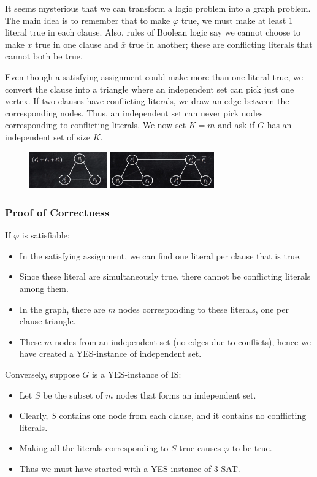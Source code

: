 It seems mysterious that we can transform a logic problem into a graph problem. The main idea is to remember that to make $\varphi$ true, we must make at least 1 literal true in each clause. Also, rules of Boolean logic say we cannot choose to make $x$ true in one clause and $\bar{x}$ true in another; these are conflicting literals that cannot both be true.

Even though a satisfying assignment could make more than one literal true, we convert the clause into a triangle where an independent set can pick just one vertex. If two clauses have conflicting literals, we draw an edge between the corresponding nodes. Thus, an independent set can never pick nodes corresponding to conflicting literals. We now set $K = m$ and ask if $G$ has an independent set of size $K$.

\begin{figure}[H]
	\centering
	\includegraphics[width=0.3\textwidth]{fig/3-literal.png}	\includegraphics[width=0.4\textwidth]{fig/converse-literal.png}
\end{figure}

\subsubsection{Proof of Correctness}
If $\varphi$ is satisfiable:
\begin{itemize}
	\item In the satisfying assignment, we can find one literal per clause that is true.
	\item Since these literal are simultaneously true, there cannot be conflicting literals among them.
	\item In the graph, there are $m$ nodes corresponding to these literals, one per clause triangle.
	\item These $m$ nodes from an independent set (no edges due to conflicts), hence we have created a YES-instance of independent set.
\end{itemize}
 
Conversely, suppose $G$ is a YES-instance of IS:
\begin{itemize}
	\item Let $S$ be the subset of $m$ nodes that forms an independent set.
	\item Clearly, $S$ contains one node from each clause, and it contains no conflicting literals.
	\item Making all the literals corresponding to $S$ true causes $\varphi$ to be true.
	\item Thus we must have started with a YES-instance of 3-SAT.
\end{itemize}
 
